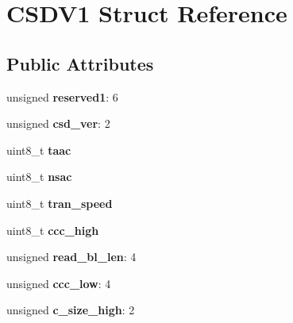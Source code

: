 \hypertarget{struct_c_s_d_v1}{}\section{C\+S\+D\+V1 Struct Reference}
\label{struct_c_s_d_v1}
\subsection*{Public Attributes}
\begin{DoxyCompactItemize}
\item 
\hypertarget{struct_c_s_d_v1_a8fc5b7146910eb474d3ea3af5fbc504b}{}unsigned {\bfseries reserved1}\+: 6\label{struct_c_s_d_v1_a8fc5b7146910eb474d3ea3af5fbc504b}

\item 
\hypertarget{struct_c_s_d_v1_a1bfd31c79faed95a073e55fba80cd21c}{}unsigned {\bfseries csd\+\_\+ver}\+: 2\label{struct_c_s_d_v1_a1bfd31c79faed95a073e55fba80cd21c}

\item 
\hypertarget{struct_c_s_d_v1_a80833a500dfa8f2292514969d7c55fd4}{}uint8\+\_\+t {\bfseries taac}\label{struct_c_s_d_v1_a80833a500dfa8f2292514969d7c55fd4}

\item 
\hypertarget{struct_c_s_d_v1_aa7089849926dbb8443cc9c499cd4af55}{}uint8\+\_\+t {\bfseries nsac}\label{struct_c_s_d_v1_aa7089849926dbb8443cc9c499cd4af55}

\item 
\hypertarget{struct_c_s_d_v1_a4f25d134cabce66589599a344c19a868}{}uint8\+\_\+t {\bfseries tran\+\_\+speed}\label{struct_c_s_d_v1_a4f25d134cabce66589599a344c19a868}

\item 
\hypertarget{struct_c_s_d_v1_ae2d032e1cda297ec9da43c9e8d320606}{}uint8\+\_\+t {\bfseries ccc\+\_\+high}\label{struct_c_s_d_v1_ae2d032e1cda297ec9da43c9e8d320606}

\item 
\hypertarget{struct_c_s_d_v1_ac814673bd138c6e3cffc9cd1f1d89d7c}{}unsigned {\bfseries read\+\_\+bl\+\_\+len}\+: 4\label{struct_c_s_d_v1_ac814673bd138c6e3cffc9cd1f1d89d7c}

\item 
\hypertarget{struct_c_s_d_v1_a5235d1c520e0e02dd7c363cb85163fe7}{}unsigned {\bfseries ccc\+\_\+low}\+: 4\label{struct_c_s_d_v1_a5235d1c520e0e02dd7c363cb85163fe7}

\item 
\hypertarget{struct_c_s_d_v1_a1db393dada90b094020d05ee296ae6e4}{}unsigned {\bfseries c\+\_\+size\+\_\+high}\+: 2\label{struct_c_s_d_v1_a1db393dada90b094020d05ee296ae6e4}


\end{DoxyCompactItemize}
